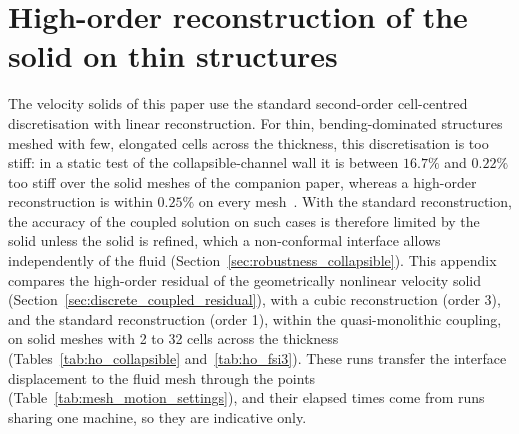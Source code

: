 \section{High-order reconstruction of the solid on thin structures}\label{app:high_order_solid}

The velocity solids of this paper use the standard second-order cell-centred discretisation with linear reconstruction.
For thin, bending-dominated structures meshed with few, elongated cells across the thickness, this discretisation is too stiff: in a static test of the collapsible-channel wall it is between $16.7\%$ and $0.22\%$ too stiff over the solid meshes of the companion paper, whereas a high-order reconstruction is within $0.25\%$ on every mesh~\citep{CardiffFSIVerification2026}.
With the standard reconstruction, the accuracy of the coupled solution on such cases is therefore limited by the solid unless the solid is refined, which a non-conformal interface allows independently of the fluid (Section~\ref{sec:robustness_collapsible}).
This appendix compares the high-order residual of the geometrically nonlinear velocity solid (Section~\ref{sec:discrete_coupled_residual}), with a cubic reconstruction (order 3), and the standard reconstruction (order 1), within the quasi-monolithic coupling, on solid meshes with 2 to 32 cells across the thickness (Tables~\ref{tab:ho_collapsible} and~\ref{tab:ho_fsi3}).
These runs transfer the interface displacement to the fluid mesh through the points (Table~\ref{tab:mesh_motion_settings}), and their elapsed times come from runs sharing one machine, so they are indicative only.

